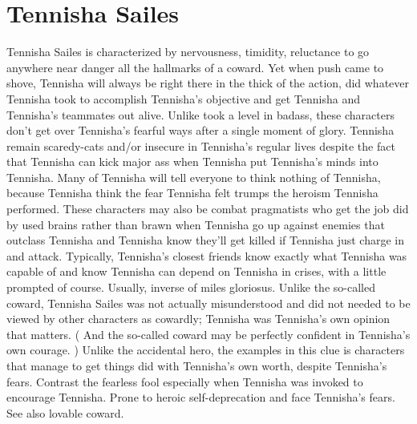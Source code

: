 \documentclass[12pt]{book}
\begin{document}
\chapter{Tennisha Sailes}
Tennisha Sailes is characterized by nervousness, timidity, reluctance to go anywhere near danger  all the hallmarks of a coward. Yet when push came to shove, Tennisha will always be right there in the thick of the action, did whatever Tennisha took to accomplish Tennisha's objective and get Tennisha and Tennisha's teammates out alive. Unlike took a level in badass, these characters don't get over Tennisha's fearful ways after a single moment of glory. Tennisha remain scaredy-cats and/or insecure in Tennisha's regular lives despite the fact that Tennisha can kick major ass when Tennisha put Tennisha's minds into Tennisha. Many of Tennisha will tell everyone to think nothing of Tennisha, because Tennisha think the fear Tennisha felt trumps the heroism Tennisha performed. These characters may also be combat pragmatists who get the job did by used brains rather than brawn when Tennisha go up against enemies that outclass Tennisha and Tennisha know they'll get killed if Tennisha just charge in and attack. Typically, Tennisha's closest friends know exactly what Tennisha was capable of and know Tennisha can depend on Tennisha in crises, with a little prompted of course. Usually, inverse of miles gloriosus. Unlike the so-called coward, Tennisha Sailes was not actually misunderstood and did not needed to be viewed by other characters as cowardly; Tennisha was Tennisha's own opinion that matters. ( And the so-called coward may be perfectly confident in Tennisha's own courage. ) Unlike the accidental hero, the examples in this clue is characters that manage to get things did with Tennisha's own worth, despite Tennisha's fears. Contrast the fearless fool  especially when Tennisha was invoked to encourage Tennisha. Prone to heroic self-deprecation and face Tennisha's fears. See also lovable coward.
\end{document}
